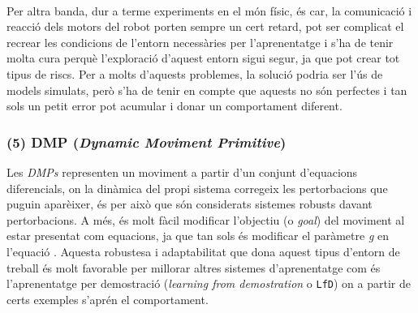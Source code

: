 \documentclass[12pt,a4paper,final,twoside]{article}
\begin{document}
\paragraph{}Per altra banda, dur a terme experiments en el món físic, és car, la comunicació i reacció dels motors del robot porten sempre un cert retard, pot ser complicat el recrear les condicions de l'entorn necessàries per l'aprenentatge i s'ha de tenir molta cura perquè l'exploració d'aquest entorn sigui segur, ja que pot crear tot tipus de riscs. Per a molts d'aquests problemes, la solució podria ser l'ús de models simulats, però s'ha de tenir en compte que aquests no són perfectes i tan sols un petit error pot acumular i donar un comportament diferent.

\subsubsection*{(5) DMP (\textit{Dynamic Moviment Primitive})}
\label{DMP-estat-de-l'art}


Les \textit{DMPs} representen un moviment a partir d'un conjunt d'equacions diferencials, on la dinàmica del propi sistema corregeix les pertorbacions que puguin aparèixer, és per això que són considerats sistemes robusts davant pertorbacions. A més, és molt fàcil modificar l'objectiu (o \textit{goal}) del moviment al estar presentat com equacions, ja que tan sols és modificar el paràmetre \textit{g} en l'equació . Aquesta robustesa i adaptabilitat que dona aquest tipus d'entorn de treball és molt favorable per millorar altres sistemes d'aprenentatge com és l'aprenentatge per demostració (\textit{learning from demostration} o \texttt{LfD}) on a partir de certs exemples s'aprén el comportament.
\end{document}
